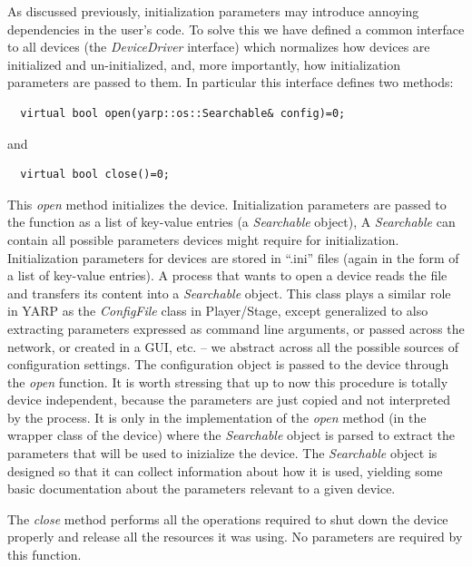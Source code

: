 As discussed previously, initialization parameters may introduce annoying 
dependencies in the user's code. To solve this we have defined a common 
interface to all devices (the 
\emph{DeviceDriver} interface) which normalizes how devices are initialized
and un-initialized, and, more importantly, how initialization parameters 
are passed to them. In particular this interface defines two methods:
\begin{verbatim}
  virtual bool open(yarp::os::Searchable& config)=0;
\end{verbatim}
and
\begin{verbatim}
  virtual bool close()=0;
\end{verbatim}
This \emph{open} method initializes the device. Initialization parameters 
are passed to the function as a list of key-value entries 
(a \emph{Searchable} object),
A \emph{Searchable} can contain all 
possible parameters devices might require for initialization. Initialization 
parameters for devices 
are stored in ``.ini'' files (again in the form of a list of key-value 
entries).
A process that wants to open a device reads 
the file and transfers its content into a \emph{Searchable} object. 
This class
plays a similar role in YARP as the {\em ConfigFile} class in Player/Stage,
except generalized to also
extracting parameters expressed as command line arguments, or
passed across the network, or created in a GUI, etc. -- we abstract
across all the possible sources of configuration settings.
The configuration
object is passed to the device through the \emph{open} function. 
It is worth stressing that up to now this procedure is totally device 
independent, because the parameters are just copied and not interpreted 
by the process. It is only in the implementation of the \emph{open} method 
(in the wrapper class of the device) where the \emph{Searchable} object 
is parsed to extract the parameters that will be used to inizialize the 
device.  The \emph{Searchable} object is designed so that it can
collect information about how it is used, yielding some basic
documentation about the parameters relevant to a given device.

The \emph{close} method performs all the operations required to shut down 
the device properly and release all the resources it was using. No
parameters are required by this function.

